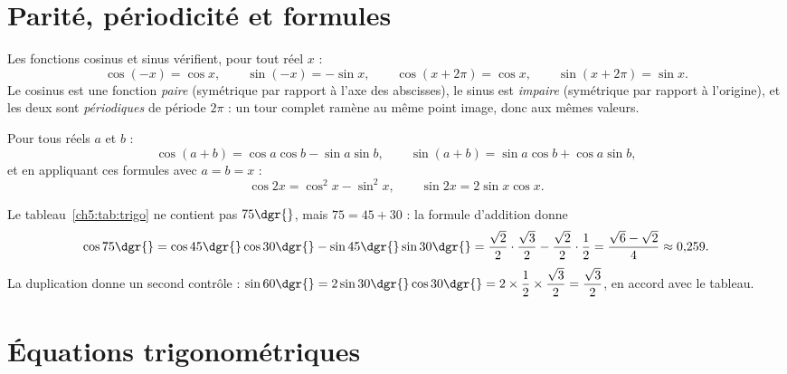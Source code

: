 \section{Parité, périodicité et formules}

\begin{propriete}
Les fonctions cosinus et sinus vérifient, pour tout réel $x$ :
\[
\cos(-x) = \cos x, \qquad \sin(-x) = -\sin x, \qquad
\cos(x + 2\pi) = \cos x, \qquad \sin(x + 2\pi) = \sin x .
\]
Le cosinus est une fonction \emph{paire} (symétrique par rapport à l'axe des abscisses), le sinus est \emph{impaire} (symétrique par rapport à l'origine), et les deux sont \emph{périodiques} de période $2\pi$ : un tour complet ramène au même point image, donc aux mêmes valeurs.
\end{propriete}

\begin{propriete}
Pour tous réels $a$ et $b$ :
\[
\cos(a + b) = \cos a \cos b - \sin a \sin b,
\qquad
\sin(a + b) = \sin a \cos b + \cos a \sin b,
\]
et en appliquant ces formules avec $a = b = x$ :
\[
\cos 2x = \cos^{2} x - \sin^{2} x,
\qquad
\sin 2x = 2 \sin x \cos x .
\]
\end{propriete}

\begin{exemple}
Le tableau~\ref{ch5:tab:trigo} ne contient pas $75\dgr{}$, mais $75 = 45 + 30$ : la formule d'addition donne
\[
\cos 75\dgr{} = \cos 45\dgr{} \cos 30\dgr{} - \sin 45\dgr{} \sin 30\dgr{}
= \frac{\sqrt{2}}{2} \cdot \frac{\sqrt{3}}{2} - \frac{\sqrt{2}}{2} \cdot \frac{1}{2}
= \frac{\sqrt{6} - \sqrt{2}}{4} \approx 0{,}259 .
\]
La duplication donne un second contrôle : $\sin 60\dgr{} = 2 \sin 30\dgr{} \cos 30\dgr{} = 2 \times \dfrac{1}{2} \times \dfrac{\sqrt{3}}{2} = \dfrac{\sqrt{3}}{2}$, en accord avec le tableau.
\end{exemple}

\section{Équations trigonométriques}

